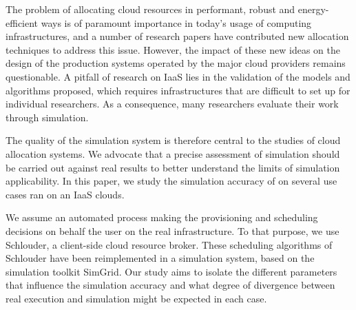 



The  problem   of  allocating   cloud  resources   in  performant,   robust  and
energy-efficient ways is  of paramount importance in today's  usage of computing
infrastructures, and a number of research papers have contributed new allocation
techniques to address this issue.  However, the impact of these new ideas on the
design of the  production systems operated by the major  cloud providers remains
questionable.   A pitfall  of research  on IaaS  lies in  the validation  of the
models  and  algorithms  proposed,   which  requires  infrastructures  that  are
difficult  to  set  up  for  individual  researchers.  As  a  consequence,  many
researchers evaluate their work through simulation.

The quality  of the  simulation system  is therefore central  to the  studies of
cloud allocation  systems. We advocate  that a precise assessment  of simulation
should be  carried out against real  results to better understand  the limits of
simulation applicability. In this paper, we study the simulation accuracy of
on several use cases ran on an IaaS clouds.


We assume an automated process  making the provisioning and scheduling decisions
on  behalf  the  user on  the  real  infrastructure.  To  that purpose,  we  use
Schlouder, a client-side  cloud resource broker. These  scheduling algorithms of
Schlouder  have  been  reimplemented  in  a  simulation  system,  based  on  the
simulation toolkit SimGrid.  Our study aims to isolate  the different parameters
that influence  the simulation  accuracy and what  degree of  divergence between
real execution and simulation might be expected in each case.




